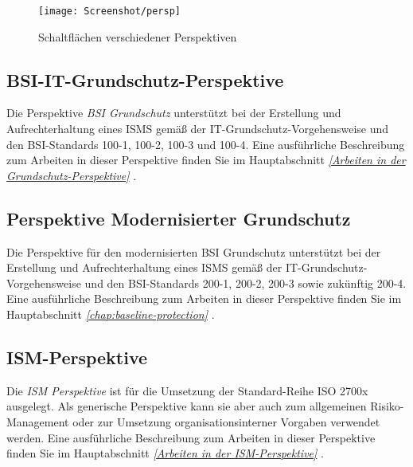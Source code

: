 \documentclass[a4paper,10pt]{book}
\begin{document}
\begin{figure}[htb!]
  \centering
  \texttt{[image: Screenshot/persp]}
  \caption{Schaltflächen verschiedener Perspektiven}
  \label{fig:window_persp}
\end{figure}

\subsection{BSI-IT-Grundschutz-Perspektive}
Die Perspektive {\em BSI Grundschutz} unterstützt bei der Erstellung und Aufrechterhaltung eines ISMS gemäß der IT-Grundschutz-Vorgehensweise
und den BSI-Standards 100-1, 100-2, 100-3 und 100-4. Eine ausführliche Beschreibung zum Arbeiten
in dieser Perspektive finden Sie im
Hauptabschnitt {\em \ref{Arbeiten in der Grundschutz-Perspektive} }.

\subsection{Perspektive Modernisierter Grundschutz}
Die Perspektive für den modernisierten BSI Grundschutz unterstützt bei der
Erstellung und Aufrechterhaltung eines ISMS gemäß der
IT-Grundschutz-Vorgehensweise und den BSI-Standards 200-1, 200-2, 200-3 sowie
zukünftig 200-4. Eine ausführliche Beschreibung zum Arbeiten in dieser
Perspektive finden Sie im Hauptabschnitt \emph{\ref{chap:baseline-protection} }.

\subsection{ISM-Perspektive}
Die {\em ISM Perspektive} ist für die Umsetzung der Standard-Reihe ISO 2700x ausgelegt. Als generische Perspektive kann sie aber auch zum
allgemeinen Risiko-Management oder zur Umsetzung organisationsinterner Vorgaben verwendet werden. Eine ausführliche Beschreibung zum
Arbeiten in dieser Perspektive finden Sie im Hauptabschnitt {\em \ref{Arbeiten in der ISM-Perspektive} }.
\end{document}
